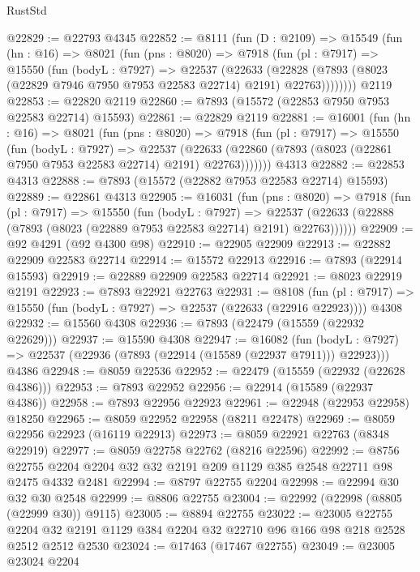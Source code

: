 \begin{lexlean}{RustStd}
\begin{coremodule}
@22829 := @22793 @4345
@22852 := @8111
    (fun (D : @2109) =>
    @15549
      (fun (hn : @16) =>
      @8021
        (fun (pns : @8020) =>
        @7918
          (fun (pl : @7917) =>
          @15550
            (fun (bodyL : @7927) =>
            @22537
              (@22633
                (@22828 (@7893 (@8023 (@22829 @7946 @7950 @7953 @22583 @22714) @2191) @22763))))))))
    @2119
@22853 := @22820 @2119
@22860 := @7893 (@15572 (@22853 @7950 @7953 @22583 @22714) @15593)
@22861 := @22829 @2119
@22881 := @16001
    (fun (hn : @16) =>
    @8021
      (fun (pns : @8020) =>
      @7918
        (fun (pl : @7917) =>
        @15550
          (fun (bodyL : @7927) =>
          @22537
            (@22633 (@22860 (@7893 (@8023 (@22861 @7950 @7953 @22583 @22714) @2191) @22763)))))))
    @4313
@22882 := @22853 @4313
@22888 := @7893 (@15572 (@22882 @7953 @22583 @22714) @15593)
@22889 := @22861 @4313
@22905 := @16031
    (fun (pns : @8020) =>
    @7918
      (fun (pl : @7917) =>
      @15550
        (fun (bodyL : @7927) =>
        @22537 (@22633 (@22888 (@7893 (@8023 (@22889 @7953 @22583 @22714) @2191) @22763))))))
@22909 := @92 @4291 (@92 @4300 @98)
@22910 := @22905 @22909
@22913 := @22882 @22909 @22583 @22714
@22914 := @15572 @22913
@22916 := @7893 (@22914 @15593)
@22919 := @22889 @22909 @22583 @22714
@22921 := @8023 @22919 @2191
@22923 := @7893 @22921 @22763
@22931 := @8108
    (fun (pl : @7917) => @15550 (fun (bodyL : @7927) => @22537 (@22633 (@22916 @22923))))
    @4308
@22932 := @15560 @4308
@22936 := @7893 (@22479 (@15559 (@22932 @22629)))
@22937 := @15590 @4308
@22947 := @16082
    (fun (bodyL : @7927) => @22537 (@22936 (@7893 (@22914 (@15589 (@22937 @7911))) @22923)))
    @4386
@22948 := @8059 @22536
@22952 := @22479 (@15559 (@22932 (@22628 @4386)))
@22953 := @7893 @22952
@22956 := @22914 (@15589 (@22937 @4386))
@22958 := @7893 @22956 @22923
@22961 := @22948 (@22953 @22958) @18250
@22965 := @8059 @22952 @22958 (@8211 @22478)
@22969 := @8059 @22956 @22923 (@16119 @22913)
@22973 := @8059 @22921 @22763 (@8348 @22919)
@22977 := @8059 @22758 @22762 (@8216 @22596)
@22992 := @8756 @22755 @2204 @2204 @32 @32 @2191 @209 @1129 @385 @2548 @22711 @98 @2475 @4332 @2481
@22994 := @8797 @22755 @2204
@22998 := @22994 @30 @32 @30 @2548
@22999 := @8806 @22755
@23004 := @22992 (@22998 (@8805 (@22999 @30)) @9115)
@23005 := @8894 @22755
@23022 := @23005
    @22755
    @2204
    @32
    @2191
    @1129
    @384
    @2204
    @32
    @22710
    @96
    @166
    @98
    @218
    @2528
    @2512
    @2512
    @2530
@23024 := @17463 (@17467 @22755)
@23049 := @23005
    @23024
    @2204

\end{coremodule}
\end{lexlean}
